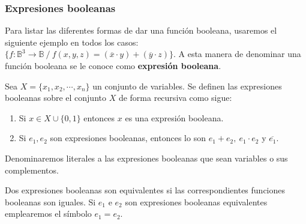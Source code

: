 \subsubsection{Expresiones booleanas}
Para listar las diferentes formas de dar una función booleana, usaremos el siguiente ejemplo en todos los casos: $\{f:\mathbb{B}^3 \rightarrow \mathbb{B} \ / \ f(x,y,z) = (\overline{x} \cdot y) + (\overline{y} \cdot z)\}$.
A esta manera de denominar una función booleana se le conoce como \textbf{expresión booleana}.
\begin{ndef}
    Sea $X = \{x_1,x_2,\cdots,x_n\}$ un conjunto de variables. Se definen las expresiones booleanas sobre el conjunto $X$  de forma recursiva como sigue:
    \begin{enumerate}
        \item Si $x \in X \cup \{0,1\}$ entonces $x$ es una expresión booleana.
        \item Si $e_1,e_2$ son expresiones booleanas, entonces lo son $e_1+e_2, \ e_1 \cdot e_2$ y $\overline{e_1}$.
    \end{enumerate}
\end{ndef}
\begin{ndef}[Literal]
    Denominaremos literales a las expresiones booleanas que sean variables o sus complementos.
\end{ndef}
\begin{ndef}
    Dos expresiones booleanas son equivalentes si las correspondientes funciones booleanas son iguales. Si $e_1$ e $e_2$ son expresiones booleanas equivalentes emplearemos el símbolo $e_1=e_2$.
\end{ndef}
